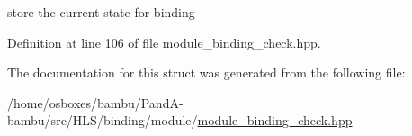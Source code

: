 store the current state for binding 



Definition at line 106 of file module\+\_\+binding\+\_\+check.\+hpp.



The documentation for this struct was generated from the following file\+:\begin{DoxyCompactItemize}
\item 
/home/osboxes/bambu/\+Pand\+A-\/bambu/src/\+H\+L\+S/binding/module/\hyperlink{module__binding__check_8hpp}{module\+\_\+binding\+\_\+check.\+hpp}\end{DoxyCompactItemize}
